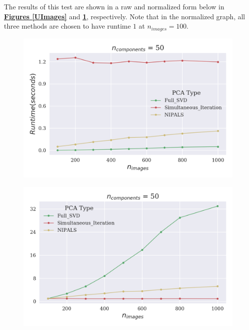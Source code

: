 \documentclass[12pt]{article}
\begin{document}
The results of this test are shown in a raw and normalized form below in \textbf{\hyperref[UPixels]{Figures \ref*{UImages}}} and \textbf{\hyperref[NPixels]{\ref*{NImages}}}, respectively. Note that in the normalized graph, all three methods are chosen to have runtime $1$ at $n_{images} = 100$.

\begin{figure}[H]
\centering
\begin{minipage}{.45\textwidth}
  \centering
  \includegraphics[width=\linewidth]{UImages.png}
  \label{UImages}
\end{minipage}%
\quad
\begin{minipage}{.45\textwidth}
  \centering
  \includegraphics[width=\linewidth]{NImages.png}
  \label{NImages}
\end{minipage}
\end{figure}
\end{document}
